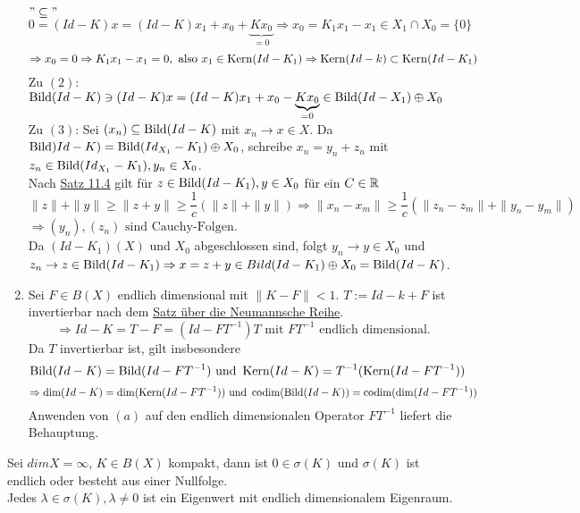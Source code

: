 \begin{beweis}
\begin{enumerate}[label=\alph*\upshape)]
				$"\subseteq"$ $0 = (Id - K) x = (Id - K) x_{1} + x_{0} + \underbrace{K x_{0}}_{= 0} \Rightarrow x_{0} = K_{1} x_{1} - x_{1} \in X_{1} \cap X_{0} = \{ 0 \} $
					\[ \Rightarrow x_{0} = 0 \Rightarrow K_{1} x_{1} - x_{1} = 0, \text{ also } x_{1} \in \mathop{\rm Kern}\nolimits(Id - K_{1}) \Rightarrow \mathop{\rm Kern}\nolimits(Id - k) \subset \mathop{\rm Kern}\nolimits(Id - K_{1}) \]
				Zu $(2)$: $\mathop{\rm Bild}\nolimits(Id - K) \ni (Id - K)x = (Id - K)x_{1} + x_{0} - \underbrace{K x_{0}}_{= 0} \in \mathop{\rm Bild}\nolimits(Id - X_{1}) \oplus X_{0}$
				Zu $(3)$: Sei $(x_{n}) \subseteq \mathop{\rm Bild}\nolimits(Id - K)$ mit $x_{n} \rightarrow x \in X$. Da $\mathop{\rm Bild}\nolimits)Id - K) = \mathop{\rm Bild}\nolimits(Id_{X_{1}} - K_{1}) \oplus X_{0}$, schreibe $x_{n} = y_{n} + z_{n}$ mit $z_{n} \in \mathop{\rm Bild}\nolimits(Id_{X_{1}} - K_{1}), y_{n} \in X_{0}$. \\
				Nach \hyperref[satz:11.4]{Satz 11.4} gilt für $z \in \mathop{\rm Bild}\nolimits(Id - K_{1}), y \in X_{0}$ für ein $C \in \mathbb{R}$
				\[ \| z \| + \| y \| \geq \| z + y \| \geq \frac{1}{c} \left( \| z \| + \| y \| \right) \Rightarrow \| x_{n} - x_{m} \| \geq \frac{1}{c} \left( \| z_{n} - z_{m} \| + \| y_{n} - y_{m} \| \right) \]
				$\Rightarrow (y_{n}), (z_{n}) \text{ sind Cauchy-Folgen}$. \\
				Da $(Id - K_{1})(X)$ und $X_{0}$ abgeschlossen sind, folgt $y_{n} \rightarrow y \in X_{0}$ und $z_{n} \rightarrow z \in \mathop{\rm Bild}\nolimits(Id - K_{1}) \Rightarrow x = z + y \in Bild(Id - K_{1}) \oplus X_{0} = \mathop{\rm Bild}\nolimits(Id - K)$.
			\item Sei $F \in B(X)$ endlich dimensional mit $\| K - F \| < 1$. $T := Id - k + F$ ist invertierbar nach dem \hyperref[prop:5.8-NeumannscheReihe]{Satz über die Neumannsche Reihe}.
				\[ \Rightarrow Id - K = T - F = (Id - F T^{-1})T \text{ mit } F T^{-1} \text{ endlich dimensional.} \]
				Da $T$ invertierbar ist, gilt insbesondere
				\[ \mathop{\rm Bild}\nolimits(Id - K) = \mathop{\rm Bild}\nolimits(Id - F T^{-1}) \text{ und } \mathop{\rm Kern}\nolimits(Id - K) = T^{-1}(\mathop{\rm Kern}\nolimits(Id - F T^{-1})) \]
				\[ \Rightarrow \dim(Id - K) = \dim(\mathop{\rm Kern}\nolimits(Id - F T^{-1})) \text{ und } \operatorname{codim}(\mathop{\rm Bild}\nolimits(Id -K)) = \operatorname{codim}(\dim(Id - F T^{-1})) \]
				Anwenden von \hyperref[satz:14.1]{$(a)$} auf den endlich dimensionalen Operator $F T^{-1}$ liefert die Behauptung.
		\end{enumerate}
\end{beweis}


\begin{satz}  \label{satz:14.3}
	Sei $dim X = \infty$, $K \in B(X)$ kompakt, dann ist $0 \in \sigma(K)$ und $\sigma(K)$ ist endlich oder besteht aus einer Nullfolge. \\
	Jedes $\lambda \in \sigma(K), \lambda \neq 0$ ist ein Eigenwert mit endlich dimensionalem Eigenraum.
\end{satz}

